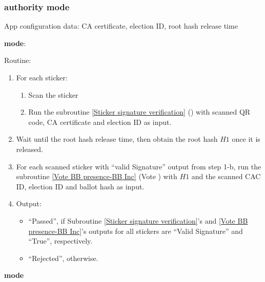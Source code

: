 \documentclass{article}
\begin{document}
\subsubsection{\remoteVotingCenter{} authority mode}


App configuration data: CA certificate, election ID, root hash release time

\textbf{\BBInclusionCheck{} mode}:


Routine:
\begin{enumerate}
    \item For each sticker:
    \begin{enumerate}
        \item Scan the sticker
        \item Run the subroutine \ref{Sticker signature verification} (\StickersignatureVerification{}) with scanned QR code, CA certificate and election ID as input. 
    \end{enumerate}
    \item Wait until the root hash release time, then obtain the root hash $H1$ once it is released.
    \item For each scanned sticker with ``valid Signature'' output from step 1-b, run the subroutine \ref{Vote BB presence-BB Inc} (Vote \BBInclusionCheck{}) with  $H1$ and the scanned CAC ID, election ID and ballot hash as input. 
    \item Output:
    \begin{itemize}
        \item ``Passed'',  if Subroutine \ref{Sticker signature verification}'s and \ref{Vote BB presence-BB Inc}'s outputs for all stickers are ``Valid Signature'' and ``True'', respectively.
        \item ``Rejected'', otherwise.
    \end{itemize}
\end{enumerate}


\textbf{\StickerBBUpload{}{} mode}
\end{document}

